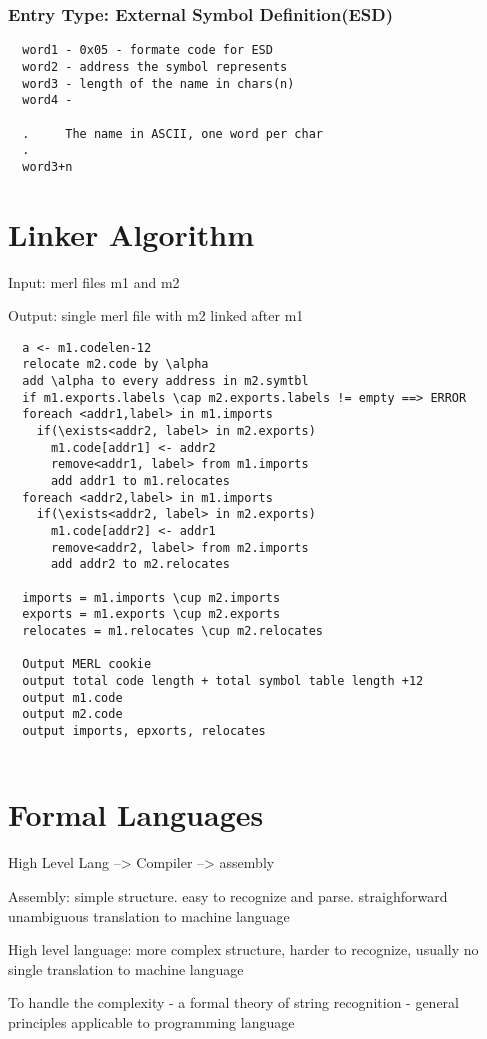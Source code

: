 \documentclass[11pt]{amsart}
\begin{document}
\subsubsection{Entry Type: External Symbol Definition(ESD)}
\begin{verbatim}
  word1 - 0x05 - formate code for ESD
  word2 - address the symbol represents
  word3 - length of the name in chars(n)
  word4 -

  .     The name in ASCII, one word per char
  .
  word3+n
\end{verbatim}
\section{Linker Algorithm}
\par Input: merl files m1 and m2
\par Output: single merl file with m2 linked after m1
\begin{verbatim}
  a <- m1.codelen-12
  relocate m2.code by \alpha
  add \alpha to every address in m2.symtbl
  if m1.exports.labels \cap m2.exports.labels != empty ==> ERROR
  foreach <addr1,label> in m1.imports
    if(\exists<addr2, label> in m2.exports)
      m1.code[addr1] <- addr2
      remove<addr1, label> from m1.imports
      add addr1 to m1.relocates
  foreach <addr2,label> in m1.imports
    if(\exists<addr2, label> in m2.exports)
      m1.code[addr2] <- addr1
      remove<addr2, label> from m2.imports
      add addr2 to m2.relocates

  imports = m1.imports \cup m2.imports
  exports = m1.exports \cup m2.exports
  relocates = m1.relocates \cup m2.relocates

  Output MERL cookie
  output total code length + total symbol table length +12
  output m1.code
  output m2.code
  output imports, epxorts, relocates


\end{verbatim}
\section{Formal Languages}
\par High Level Lang --> Compiler --> assembly
\par Assembly: simple structure. easy to recognize and parse. straighforward
unambiguous translation to machine language
\par High level language: more complex structure, harder to recognize, usually
no single translation to machine language
\par To handle the complexity - a formal theory of string recognition - general
principles applicable to programming language
\end{document}
